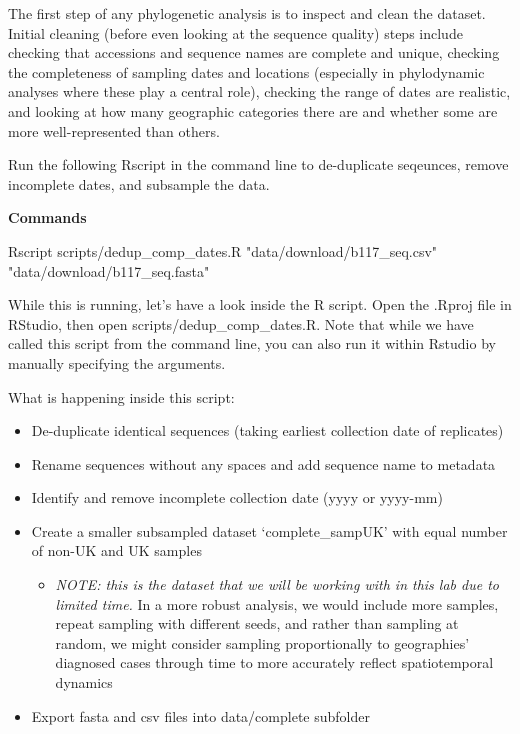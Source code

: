 \documentclass[
]{book}
\newenvironment{Shaded}{\begin{snugshade}}{\end{snugshade}}
\newcommand{\ExtensionTok}[1]{#1}
\newcommand{\NormalTok}[1]{#1}
\newcommand{\StringTok}[1]{\textcolor[rgb]{0.31,0.60,0.02}{#1}}
\providecommand{\tightlist}{%
  \setlength{\itemsep}{0pt}\setlength{\parskip}{0pt}}
\begin{document}
The first step of any phylogenetic analysis is to inspect and clean the dataset. Initial cleaning (before even looking at the sequence quality) steps include checking that accessions and sequence names are complete and unique, checking the completeness of sampling dates and locations (especially in phylodynamic analyses where these play a central role), checking the range of dates are realistic, and looking at how many geographic categories there are and whether some are more well-represented than others.

Run the following Rscript in the command line to de-duplicate seqeunces, remove incomplete dates, and subsample the data.

\textbf{Commands}

\begin{Shaded}
\begin{Highlighting}[]
\ExtensionTok{Rscript}\NormalTok{ scripts/dedup\_comp\_dates.R }\StringTok{"data/download/b117\_seq.csv"} \StringTok{"data/download/b117\_seq.fasta"}
\end{Highlighting}
\end{Shaded}

While this is running, let's have a look inside the R script. Open the .Rproj file in RStudio, then open scripts/dedup\_comp\_dates.R. Note that while we have called this script from the command line, you can also run it within Rstudio by manually specifying the arguments.

What is happening inside this script:

\begin{itemize}
\tightlist
\item
  De-duplicate identical sequences (taking earliest collection date of replicates)
\item
  Rename sequences without any spaces and add sequence name to metadata
\item
  Identify and remove incomplete collection date (yyyy or yyyy-mm)
\item
  Create a smaller subsampled dataset `complete\_sampUK' with equal number of non-UK and UK samples

  \begin{itemize}
  \tightlist
  \item
    \emph{NOTE: this is the dataset that we will be working with in this lab due to limited time.} In a more robust analysis, we would include more samples, repeat sampling with different seeds, and rather than sampling at random, we might consider sampling proportionally to geographies' diagnosed cases through time to more accurately reflect spatiotemporal dynamics
  \end{itemize}
\item
  Export fasta and csv files into data/complete subfolder
\end{itemize}
\end{document}
